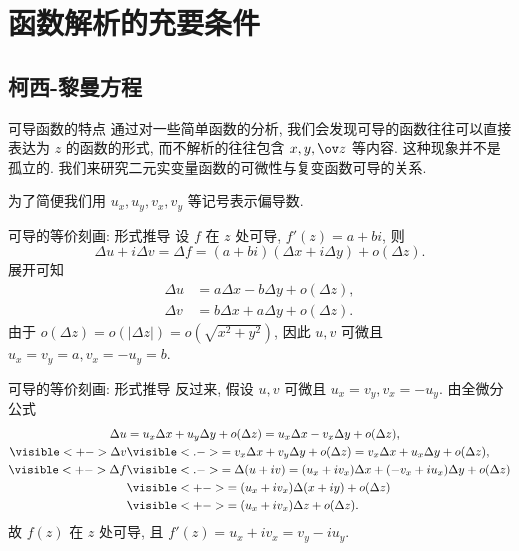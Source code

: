\section{函数解析的充要条件}

\subsection{柯西-黎曼方程}
\begin{frame}{可导函数的特点}
	\onslide<+->
	通过对一些简单函数的分析, 我们会发现可导的函数往往可以直接表达为 $z$ 的函数的形式, 而不解析的往往包含 $x,y,\ov z$ 等内容.
	\onslide<+->
	这种现象并不是孤立的.
	\onslide<+->
	我们来研究二元实变量函数的可微性与复变函数可导的关系.

	\onslide<+->
	为了简便我们用 $u_x,u_y,v_x,v_y$ 等记号表示偏导数.
\end{frame}


\begin{frame}{可导的等价刻画: 形式推导}
	\onslide<+->
	设 \alert{$f$ 在 $z$ 处可导}, $f'(z)=a+bi$,
	\onslide<+->
	则
	\[\Delta u+i\Delta v=\Delta f=(a+bi)(\Delta x+i\Delta y)+o(\Delta z).\]
	\onslide<+->展开可知
	\begin{align*}
		\Delta u&=a\Delta x-b\Delta y+o(\Delta z),\\
		\Delta v&=b\Delta x+a\Delta y+o(\Delta z).
	\end{align*}
	\onslide<+->
	由于 $o(\Delta z)=o(|\Delta z|)=o(\sqrt{x^2+y^2})$,
	\onslide<+->
	因此 \alert{$u,v$ 可微且 $u_x=v_y=a,v_x=-u_y=b$}.
\end{frame}


\begin{frame}{可导的等价刻画: 形式推导}
	\onslide<+->
	反过来, 假设 \alert{$u,v$ 可微且 $u_x=v_y, v_x=-u_y$}.
	\onslide<+->
	由全微分公式
	\begin{align*}
		\Delta u&=u_x\Delta x+u_y\Delta y+o(\Delta z)
			=u_x\Delta x-v_x\Delta y+o(\Delta z),\\
			\visible<+->{\Delta v}&\visible<.->{=v_x\Delta x+v_y\Delta y+o(\Delta z)
			=v_x\Delta x+u_x\Delta y+o(\Delta z),}\\
		\visible<+->{\Delta f}&
		\visible<.->{=\Delta (u+iv)=(u_x+i v_x)\Delta x+(-v_x+i u_x)\Delta y}+o(\Delta z)\\
		&\visible<+->{=(u_x+i v_x)\Delta(x+iy)+o(\Delta z)}\\
		&\visible<+->{=(u_x+i v_x)\Delta z+o(\Delta z).}
	\end{align*}
	\onslide<+->
	故 \alert{$f(z)$ 在 $z$ 处可导, 且 $f'(z)=u_x+i v_x=v_y-i u_y$}.
\end{frame}


